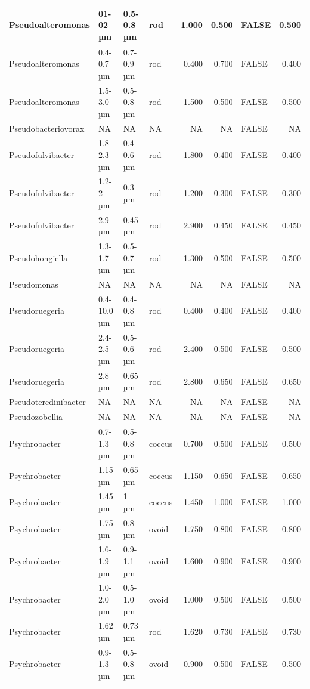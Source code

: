 \documentclass[
]{article}
\begin{document}
\begin{table}
\begin{tabular}{l|l|l|l|r|r|l|r}
\hline
Pseudoalteromonas & 01-02 µm & 0.5-0.8 µm & rod & 1.000 & 0.500 & FALSE & 0.500\\
\hline
Pseudoalteromonas & 0.4-0.7 µm & 0.7-0.9 µm & rod & 0.400 & 0.700 & FALSE & 0.400\\
\hline
Pseudoalteromonas & 1.5-3.0 µm & 0.5-0.8 µm & rod & 1.500 & 0.500 & FALSE & 0.500\\
\hline
Pseudobacteriovorax & NA & NA & NA & NA & NA & FALSE & NA\\
\hline
Pseudofulvibacter & 1.8-2.3 µm & 0.4-0.6 µm & rod & 1.800 & 0.400 & FALSE & 0.400\\
\hline
Pseudofulvibacter & 1.2-2 µm & 0.3 µm & rod & 1.200 & 0.300 & FALSE & 0.300\\
\hline
Pseudofulvibacter & 2.9 µm & 0.45 µm & rod & 2.900 & 0.450 & FALSE & 0.450\\
\hline
Pseudohongiella & 1.3-1.7 µm & 0.5-0.7 µm & rod & 1.300 & 0.500 & FALSE & 0.500\\
\hline
Pseudomonas & NA & NA & NA & NA & NA & FALSE & NA\\
\hline
Pseudoruegeria & 0.4-10.0 µm & 0.4-0.8 µm & rod & 0.400 & 0.400 & FALSE & 0.400\\
\hline
Pseudoruegeria & 2.4-2.5 µm & 0.5-0.6 µm & rod & 2.400 & 0.500 & FALSE & 0.500\\
\hline
Pseudoruegeria & 2.8 µm & 0.65 µm & rod & 2.800 & 0.650 & FALSE & 0.650\\
\hline
Pseudoteredinibacter & NA & NA & NA & NA & NA & FALSE & NA\\
\hline
Pseudozobellia & NA & NA & NA & NA & NA & FALSE & NA\\
\hline
Psychrobacter & 0.7-1.3 µm & 0.5-0.8 µm & coccus & 0.700 & 0.500 & FALSE & 0.500\\
\hline
Psychrobacter & 1.15 µm & 0.65 µm & coccus & 1.150 & 0.650 & FALSE & 0.650\\
\hline
Psychrobacter & 1.45 µm & 1 µm & coccus & 1.450 & 1.000 & FALSE & 1.000\\
\hline
Psychrobacter & 1.75 µm & 0.8 µm & ovoid & 1.750 & 0.800 & FALSE & 0.800\\
\hline
Psychrobacter & 1.6-1.9 µm & 0.9-1.1 µm & ovoid & 1.600 & 0.900 & FALSE & 0.900\\
\hline
Psychrobacter & 1.0-2.0 µm & 0.5-1.0 µm & ovoid & 1.000 & 0.500 & FALSE & 0.500\\
\hline
Psychrobacter & 1.62 µm & 0.73 µm & rod & 1.620 & 0.730 & FALSE & 0.730\\
\hline
Psychrobacter & 0.9-1.3 µm & 0.5-0.8 µm & ovoid & 0.900 & 0.500 & FALSE & 0.500\\

\end{tabular}
\end{table}
\end{document}
